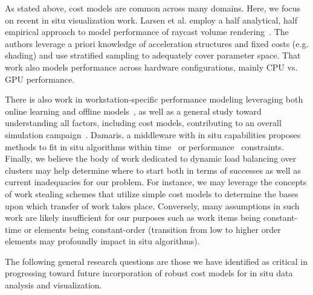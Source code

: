 \begin{refsection}
As stated above, cost models are common across many domains.   
Here, we focus on recent in situ visualization work.  
Larsen et al. employ a half analytical, half empirical approach to model performance of raycast volume rendering~\cite{Larsen16}. 
The authors leverage a priori knowledge of acceleration structures and fixed costs (e.g. shading) and use stratified sampling to adequately cover parameter space.  
That work also models performance across hardware configurations, mainly CPU vs. GPU performance.  

There is also work in workstation-specific performance modeling leveraging both online learning and offline models~\cite{Bruder17}, as well as a general study toward understanding all factors, including cost models, contributing to an overall simulation campaign~\cite{Kress16}.
Damaris, a middleware with in situ capabilities proposes methods to fit in situ algorithms within time~\cite{Dorier13} or performance~\cite{Dorier16} constraints.
Finally, we believe the body of work dedicated to dynamic load balancing over clusters may help determine where to start both in terms of successes as well as current inadequacies for our problem.  
For instance, we may leverage the concepts of work stealing schemes that utilize simple cost models to determine the bases upon which transfer of work takes place.  
Conversely, many assumptions in such work are likely insufficient for our purposes such as work items being constant-time or elements being constant-order (transition from low to higher order elements may profoundly impact in situ algorithms).


The following general research questions are those we have identified as critical in progressing toward future incorporation of robust cost models for in situ data analysis and visualization.


\end{refsection}
